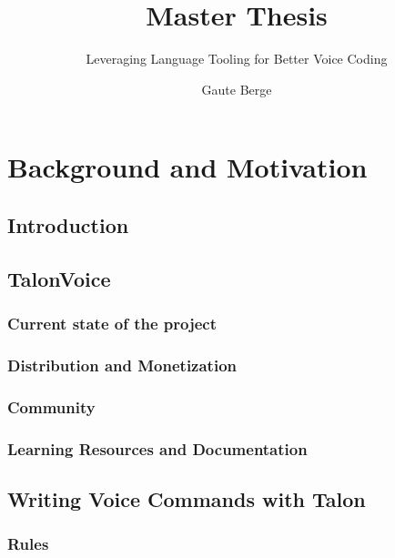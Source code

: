 \documentclass[a4paper,english]{ifimaster}
\title{Master Thesis}
\subtitle{Leveraging Language Tooling for Better Voice Coding}
\author{Gaute Berge}
\begin{document}
\duoforside[dept={Department of Informatics},
program={Informatics: Programming and System Architecture},
long]

\frontmatter{}

\tableofcontents{}


\mainmatter{}
\chapter{Background and Motivation}

\section{Introduction}

\section{TalonVoice}
\subsection{Current state of the project}
\subsection{Distribution and Monetization}
\subsection{Community}
\subsection{Learning Resources and Documentation}
\section{Writing Voice Commands with Talon}
\subsection{Rules}
\end{document}
